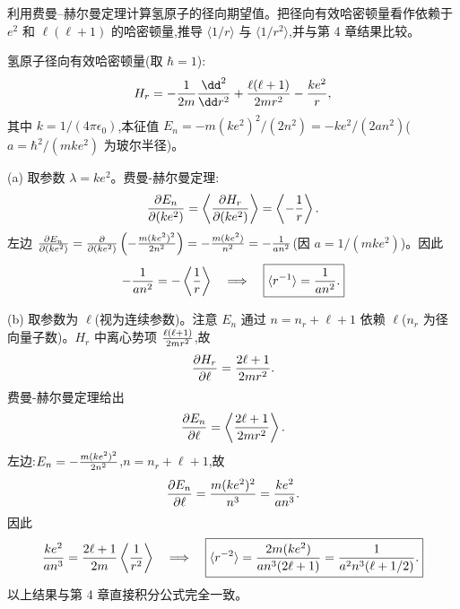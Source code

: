 \begin{question}
利用费曼--赫尔曼定理计算氢原子的径向期望值。把径向有效哈密顿量看作依赖于 $e^2$ 和 $\ell(\ell+1)$ 的哈密顿量,推导 $\langle1/r\rangle$ 与 $\langle1/r^2\rangle$,并与第 4 章结果比较。
\end{question}
\begin{solution}
氢原子径向有效哈密顿量(取 $\hbar=1$):
\[
H_r = -{1\over2m}{\dd^2\over\dd r^2} + {\ell(\ell+1)\over2mr^2} - {ke^2\over r},
\]
其中 $k=1/(4\pi\epsilon_0)$,本征值 $E_n=-m(ke^2)^2/(2n^2)=-ke^2/(2an^2)$($a=\hbar^2/(mke^2)$ 为玻尔半径)。

(a) 取参数 $\lambda=ke^2$。费曼-赫尔曼定理:
\[
{\partial E_n\over\partial(ke^2)} = \left\langle {\partial H_r\over\partial(ke^2)} \right\rangle = \left\langle -{1\over r} \right\rangle.
\]
左边 ${\partial E_n\over\partial(ke^2)} = {\partial\over\partial(ke^2)}\left(-{m(ke^2)^2\over2n^2}\right) = -{m(ke^2)\over n^2} = -{1\over a n^2}$(因 $a=1/(mke^2)$)。因此
\[
-{1\over a n^2} = -\left\langle {1\over r} \right\rangle\quad\Longrightarrow\quad
\boxed{\langle r^{-1}\rangle = {1\over an^2}.}
\]

(b) 取参数为 $\ell$(视为连续参数)。注意 $E_n$ 通过 $n=n_r+\ell+1$ 依赖 $\ell$($n_r$ 为径向量子数)。$H_r$ 中离心势项 ${\ell(\ell+1)\over2mr^2}$,故
\[
{\partial H_r\over\partial\ell} = {2\ell+1\over2mr^2}.
\]
费曼-赫尔曼定理给出
\[
{\partial E_n\over\partial\ell} = \left\langle {2\ell+1\over2mr^2} \right\rangle.
\]
左边:$E_n=-{m(ke^2)^2\over2n^2}$,$n=n_r+\ell+1$,故
\[
{\partial E_n\over\partial\ell} = {m(ke^2)^2\over n^3} = {ke^2\over a n^3}.
\]
因此
\[
{ke^2\over a n^3} = {2\ell+1\over2m}\left\langle{1\over r^2}\right\rangle
\quad\Longrightarrow\quad
\boxed{\langle r^{-2}\rangle = {2m(ke^2)\over a n^3(2\ell+1)} = {1\over a^2 n^3(\ell+1/2)}.}
\]
以上结果与第 4 章直接积分公式完全一致。
\end{solution}

